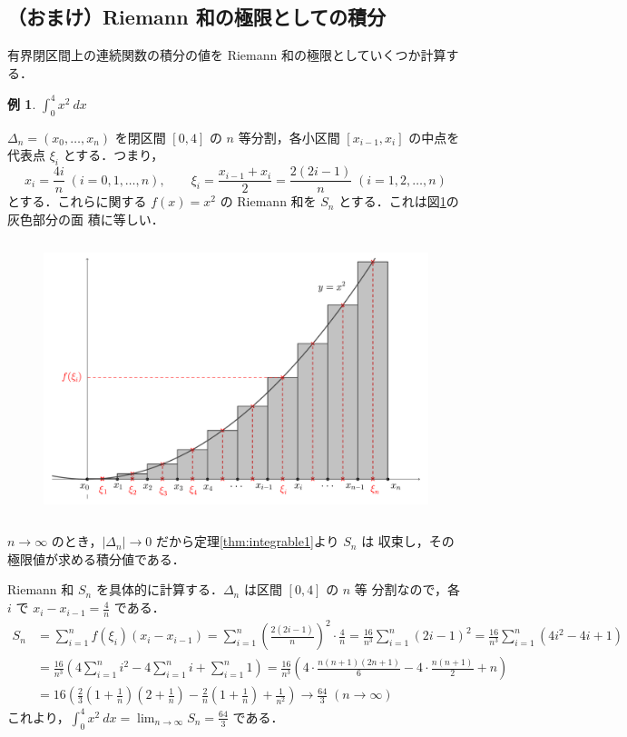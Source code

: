 \documentclass[10pt, uplatex, dvipdfmx]{jsarticle}
\theoremstyle{definition}
\newtheorem{example}[theorem]{例}
\numberwithin{equation}{section}
\newcommand{\ds}{\displaystyle}
\begin{document}
\subsection{（おまけ）Riemann 和の極限としての積分}\label{sec:Rsum_computation}
有界閉区間上の連続関数の積分の値を Riemann 和の極限としていくつか計算する．

\begin{example}
$\ds \int_{0}^{4} x^2 \ dx$ 

  \vspace{1zh}

  $\Delta_n=(x_0, \ldots, x_n)$ を閉区間 $[0,4]$ の $n$ 等分割，各小区間 $[x_{i-1}, x_i]$
  の中点を代表点 $\xi_i$ とする．つまり，
  \[
    x_i = \frac{4i}{n} \; (i=0,1, \ldots, n) , \qquad \xi_i =
    \frac{x_{i-1} + x_{i}}{2} = \frac{2(2i-1)}{n} \; (i=1,2, \ldots, n)
  \]
  とする．これらに関する $f(x) =
  x^2$ の Riemann 和を $S_n$ とする．これは図\ref{fig:Rsum_quadratic}の灰色部分の面
  積に等しい．
  \begin{figure}[h]
    \centering
    \includegraphics[height=8cm]{./pictures/02/quadratic.pdf}
    \caption{}\label{fig:Rsum_quadratic}
  \end{figure}
  $n \to \infty$ のとき，$|\Delta_n| \to 0$ だから定理\ref{thm:integrable1}より $S_n$ は
  収束し，その極限値が求める積分値である．

  Riemann 和 $\ds S_n $ を具体的に計算する．$\Delta_n$ は区間 $[0,4]$ の $n$ 等
  分割なので，各 $i$ で $\ds x_{i} - x_{i-1} = \frac{4}{n}$ である．
  \[
    \begin{aligned}
      S_n &= \sum_{i=1}^{n} f(\xi_i)(x_i - x_{i-1})
            = \sum_{i=1}^{n} \left( \frac{2(2i-1)}{n}\right)^2 \cdot \frac{4}{n}
            =\frac{16}{n^3}\sum_{i=1}^{n} (2i-1)^2
            = \frac{16}{n^3} \sum_{i=1}^{n} \left(4i^2-4i+1\right)\\
          &  = \frac{16}{n^3} \left( 4 \sum_{i=1}^{n} i^2 - 4 \sum_{i=1}^{n} i + \sum_{i=1}^{n} 1\right)
            = \frac{16}{n^3} \left( 4 \cdot \frac{n(n+1)(2n+1)}{6} - 4 \cdot \frac{n(n+1)}{2} + n\right)\\
          &= 16 \left( \frac{2}{3} \left( 1 + \frac{1}{n}\right)\left(2+\frac{1}{n}\right)
            - \frac{2}{n} \left(1+\frac{1}{n}\right) + \frac{1}{n^2}\right) \to \frac{64}{3} \; (n \to \infty)
    \end{aligned}
  \]
  これより，$\ds \int_{0}^{4}x^2 \ dx = \lim_{n \to \infty} S_n = \frac{64}{3}$ である．
\end{example}
\end{document}

